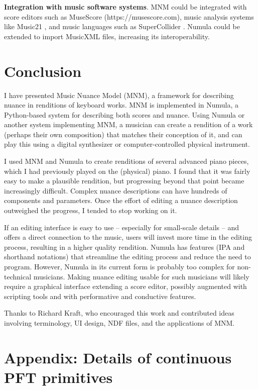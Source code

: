 \documentclass[letterpaper, 12pt]{article}
\begin{document}
\textbf{Integration with music software systems}.
MNM could be integrated with 
score editors such as MuseScore (https://musescore.com),
music analysis systems like Music21 \citep{Cuthbert2010},
and music languages such as SuperCollider \citep{McCartney2002}.
Numula could be extended to import MusicXML files,
increasing its interoperability.

\section{Conclusion}

I have presented Music Nuance Model (MNM),
a framework for describing nuance in renditions of keyboard works.
MNM is implemented in Numula,
a Python-based system for describing both scores and nuance.
Using Numula or another system implementing MNM,
a musician can create a rendition of a work (perhaps their own composition)
that matches their conception of it,
and can play this using
a digital synthesizer or computer-controlled physical instrument.

I used MNM and Numula to create renditions of several advanced piano pieces,
which I had previously played on the (physical) piano.
I found that it was fairly easy to make a plausible rendition,
but progressing beyond that point became increasingly difficult.
Complex nuance descriptions can have hundreds of components and parameters.
Once the effort of editing a nuance description outweighed the progress,
I tended to stop working on it.

If an editing interface is easy to use --
especially for small-scale details --
and offers a direct connection to the music,
users will invest more time in the editing process,
resulting in a higher quality rendition.
Numula has features (IPA and shorthand notations) that streamline
the editing process and reduce the need to program.
However, Numula in its current form is probably too complex
for non-technical musicians.
Making nuance editing usable for such musicians will likely
require a graphical interface extending a score editor,
possibly augmented with scripting tools
and with performative and conductive features.

Thanks to Richard Kraft, who encouraged this work and contributed ideas
involving terminology, UI design, NDF files, and the applications of MNM.

\section{Appendix: Details of continuous PFT primitives}
\end{document}
